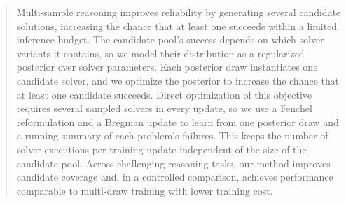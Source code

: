 \begin{abstract}
Multi-sample reasoning improves reliability by generating several candidate solutions, increasing the chance that at least one succeeds within a limited inference budget.
The candidate pool's success depends on which solver variants it contains, so we model their distribution as a regularized posterior over solver parameters.
Each posterior draw instantiates one candidate solver, and we optimize the posterior to increase the chance that at least one candidate succeeds.
Direct optimization of this objective requires several sampled solvers in every update, so we use a Fenchel reformulation and a Bregman update to learn from one posterior draw and a running summary of each problem's failures.
This keeps the number of solver executions per training update independent of the size of the candidate pool.
Across challenging reasoning tasks, our method improves candidate coverage and, in a controlled comparison, achieves performance comparable to multi-draw training with lower training cost.
\end{abstract}
